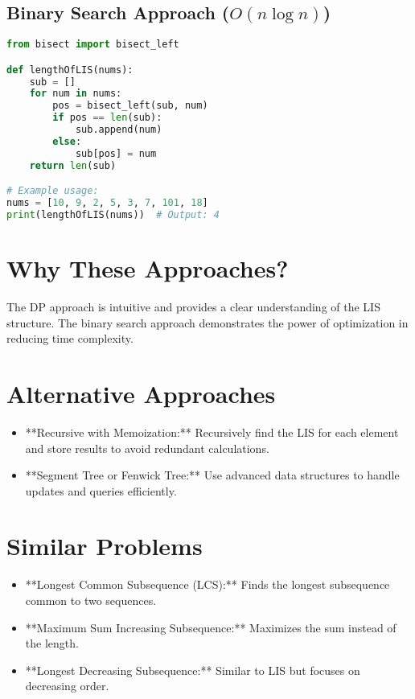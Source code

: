\subsection*{Binary Search Approach (\(O(n \log n)\))}
\begin{fullwidth}
\begin{lstlisting}[language=Python]
from bisect import bisect_left

def lengthOfLIS(nums):
    sub = []
    for num in nums:
        pos = bisect_left(sub, num)
        if pos == len(sub):
            sub.append(num)
        else:
            sub[pos] = num
    return len(sub)

# Example usage:
nums = [10, 9, 2, 5, 3, 7, 101, 18]
print(lengthOfLIS(nums))  # Output: 4
\end{lstlisting}
\end{fullwidth}

\section*{Why These Approaches?}
The DP approach is intuitive and provides a clear understanding of the LIS structure. The binary search approach demonstrates the power of optimization in reducing time complexity.

\section*{Alternative Approaches}
\begin{itemize}
    \item **Recursive with Memoization:** Recursively find the LIS for each element and store results to avoid redundant calculations.
    \item **Segment Tree or Fenwick Tree:** Use advanced data structures to handle updates and queries efficiently.
\end{itemize}

\section*{Similar Problems}
\begin{itemize}
    \item **Longest Common Subsequence (LCS):** Finds the longest subsequence common to two sequences.
    \item **Maximum Sum Increasing Subsequence:** Maximizes the sum instead of the length.
    \item **Longest Decreasing Subsequence:** Similar to LIS but focuses on decreasing order.
\end{itemize}

